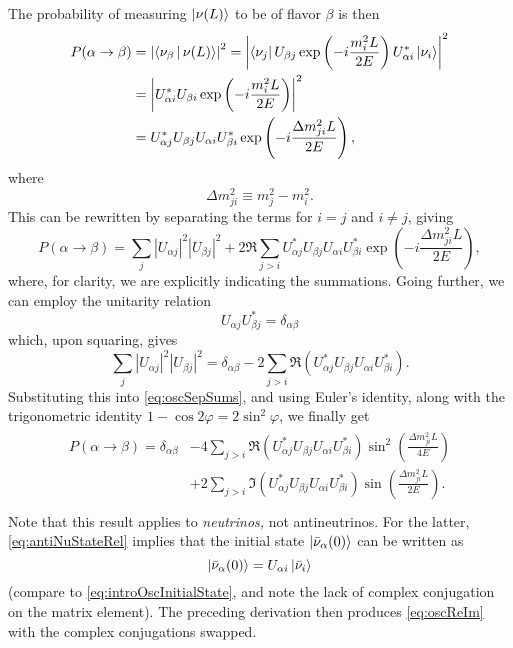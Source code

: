 \documentclass[../thesis.tex]{subfiles}
\begin{document}
The probability of measuring $\ket{\nu(L)}$ to be of flavor $\beta$ is then
\begin{align*}
  P(\alpha \rightarrow \beta)
  &= \left|\Braket{\nu_\beta|\nu(L)}\right|^2
    = \left| \Bra{\nu_j} U_{\beta j} \exp\left( -i\frac{m_i^2L}{2E} \right) U^*_{\alpha i}\Ket{\nu_i}\right|^2 \\
  &=  \left| U^*_{\alpha i} U_{\beta i} \exp\left( -i \frac{m_i^2L}{2E} \right)\right|^2 \\
  &= U^*_{\alpha j} U_{\beta j} U_{\alpha i} U^*_{\beta i} \exp\left( -i \frac{\Delta m^2_{ji}L}{2E} \right),
\end{align*}
where
\begin{equation}
  \Delta m^2_{ji} \equiv m^2_j - m^2_i.
\end{equation}
This can be rewritten by separating the terms for \(i = j\) and \(i \neq j\), giving
\begin{equation}
  \label{eq:oscSepSums}
  P(\alpha \rightarrow \beta) = \sum_{j} |U_{\alpha j}|^2 |U_{\beta j}|^2
  + 2 \Re \sum_{j>i} U^*_{\alpha j} U_{\beta j} U_{\alpha i} U^*_{\beta i}
  \exp\left( -i \frac{\Delta m^2_{ji}L}{2E} \right),
\end{equation}
where, for clarity, we are explicitly indicating the summations. Going further, we can employ the unitarity relation
\begin{equation}
  U_{\alpha j} U^*_{\beta j} = \delta_{\alpha \beta}
\end{equation}
which, upon squaring, gives
\begin{equation}
  \sum_j |U_{\alpha j}|^2 |U_{\beta j}|^2 = \delta_{\alpha \beta}
  - 2 \sum_{j > i} \Re(U^*_{\alpha j} U_{\beta j} U_{\alpha i} U^*_{\beta i}).
\end{equation}
Substituting this into \autoref{eq:oscSepSums}, and using Euler's identity, along with the trigonometric identity \(1 - \cos 2\varphi = 2\sin^2 \varphi\), we finally get
\begin{align}
  \label{eq:oscReIm}
  \begin{split}
    P(\alpha \rightarrow \beta) = \delta_{\alpha \beta} &- 4\sum_{j > i} \Re(U^*_{\alpha j} U_{\beta j} U_{\alpha i} U^*_{\beta i})
    \sin^2 \left( \frac{\Delta m^2_{ji}L}{4E} \right) \\
    &+ 2\sum_{j > i} \Im(U^*_{\alpha j} U_{\beta j} U_{\alpha i} U^*_{\beta i})
    \sin \left( \frac{\Delta m^2_{ji}L}{2E} \right). \\
  \end{split}
\end{align}
Note that this result applies to \emph{neutrinos,} not antineutrinos. For the latter, \autoref{eq:antiNuStateRel} implies that the initial state $\ket{\bar\nu_\alpha(0)}$ can be written as 
\begin{equation}
  \ket{\bar\nu_\alpha(0)} = U_{\alpha i}\ket{\bar\nu_i}
\end{equation}
(compare to \autoref{eq:introOscInitialState}, and note the lack of complex conjugation on the matrix element). The preceding derivation then produces \autoref{eq:oscReIm} with the complex conjugations swapped.
\end{document}

